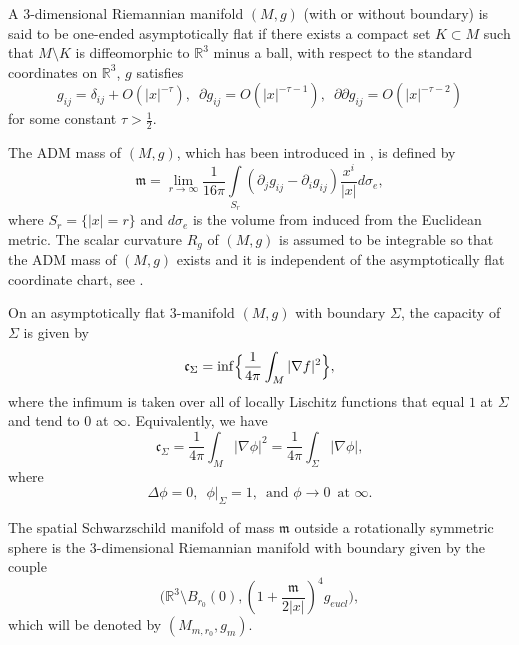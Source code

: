 \documentclass[12pt]{article}
\theoremstyle{definition}
\theoremstyle{plain}
\numberwithin{equation}{section}
\begin{document}
A 3-dimensional Riemannian manifold $ (M,g) $ (with or without boundary) is said to be one-ended asymptotically flat if there exists a compact set $ K\subset M $ such that $ M\setminus K $ is diffeomorphic to $ \mathbb{R}^{3} $ minus a ball, with respect to the standard coordinates on $ \mathbb{R}^{3} $, $ g $ satisfies
$$
g_{ij}=\delta_{ij}+O(|x|^{-\tau}),\,\,\,\partial g_{ij}=O(|x|^{-\tau-1}),\,\,\,\partial\partial g_{ij}=O(|x|^{-\tau-2})
$$
for some constant $ \tau>\frac{1}{2} $. 

The ADM mass of $ (M,g) $, which has been introduced in \cite{ADM}, is defined by 
$$
\mathfrak{m}=\lim\limits_{r\to \infty}\frac{1}{16\pi}\int\limits_{S_{r}}(\partial_{j}g_{ij}-\partial_{i}g_{ij})\frac{x^{i}}{|x|}d\sigma_{e},
$$
where $ S_{r}=\{|x|=r \} $ and $ d\sigma_{e} $ is the volume from induced from the Euclidean metric. The scalar curvature $ R_{g} $ of $ (M,g) $ is assumed to be integrable so that the ADM mass of $ (M,g) $ exists and it is independent of the asymptotically flat coordinate chart, see \cite{Bar}. 

On an asymptotically flat 3-manifold $ (M,g) $ with boundary $ \Sigma $, the capacity of $ \Sigma $ is given by 
$$
\mathfrak{c}_{\Sigma}=\inf\Bigl\{\frac{1}{4\pi}\int_{M}|\nabla f|^{2} \Big\},
$$
where the infimum is taken over all of locally Lischitz functions that equal $ 1 $ at $ \Sigma $ and tend to $ 0 $ at $ \infty $. Equivalently, we have 
$$
\mathfrak{c}_{\Sigma}=\frac{1}{4\pi}\int_{M}|\nabla \phi|^{2}=\frac{1}{4\pi}\int_{\Sigma}|\nabla \phi|, 
$$
where
$$
\Delta \phi=0,\,\,\,\phi |_{\Sigma}=1,\,\,\,\text{and }\phi\to 0\,\,\,\text{at } \infty.
$$

The spatial Schwarzschild manifold of mass $ \mathfrak{m} $ outside a rotationally symmetric sphere is the 3-dimensional Riemannian manifold with boundary given by the couple 
\begin{equation}\label{Sch}
\Big(\mathbb{R}^{3}\setminus B_{r_{0}}(0), (1+\frac{\mathfrak{m}}{2|x|})^{4}g_{eucl} \Big),
\end{equation}
which will be denoted by $ (M_{m,r_{0}},g_{m}) $.
\end{document}
